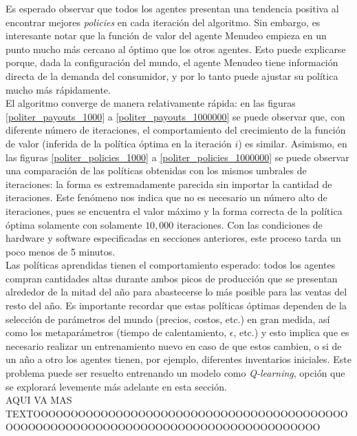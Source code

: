 Es esperado observar  que todos los agentes presentan una tendencia positiva al encontrar mejores \textit{policies} en cada iteraci\'on del algoritmo. Sin embargo, es interesante notar que la funci\'on de valor del agente Menudeo empieza en un punto mucho m\'as cercano al \'optimo que los otros agentes. Esto puede explicarse porque, dada la configuraci\'on del mundo, el agente Menudeo tiene informaci\'on directa de la demanda del consumidor, y por lo tanto puede ajustar su pol\'itica mucho m\'as r\'apidamente.\\

El algoritmo converge de manera relativamente r\'apida: en las figuras  \ref{politer_payouts_1000} a \ref{politer_payouts_1000000} se puede observar que, con diferente n\'umero de iteraciones, el comportamiento del crecimiento de la funci\'on de valor (inferida de la pol\'itica \'optima en la iteraci\'on $i$) es similar. Asimismo, en las figuras \ref{politer_policies_1000} a \ref{politer_policies_1000000} se puede observar una comparaci\'on de las pol\'iticas obtenidas con los mismos umbrales de iteraciones: la forma es extremadamente parecida sin importar la cantidad de iteraciones. Este fen\'omeno nos indica que no es necesario un n\'umero alto de iteraciones, pues se encuentra el valor m\'aximo y la forma correcta de la pol\'itica \'optima solamente con solamente $10,000$ iteraciones. Con las condiciones de hardware y software especificadas en secciones anteriores, este proceso tarda un poco menos de 5 minutos.\\

Las pol\'iticas aprendidas tienen el comportamiento esperado: todos los agentes compran cantidades altas durante ambos picos de producci\'on que se presentan alrededor de la mitad del a\~no para abastecerse lo m\'as posible para las ventas del resto del a\~no. Es importante recordar que estas pol\'iticas \'optimas dependen de la selecci\'on de par\'ametros del mundo (precios, costos, etc.) en gran medida, as\'i como los metapar\'ametros (tiempo de calentamiento, $\epsilon$, etc.) y esto implica que es necesario realizar un entrenamiento nuevo en caso de que estos cambien, o si de un a\~no a otro los agentes tienen, por ejemplo, diferentes inventarios iniciales. Este problema puede ser resuelto entrenando un modelo como \textit{Q-learning}, opci\'on que se explorar\'a levemente m\'as adelante en esta secci\'on.\\


AQUI VA MAS TEXTOOOOOOOOOOOOOOOOOOOOOOOOOOOOOOOOOOOOOOOOOOOOOOOOOOOOOOOOOOOOOOOOOOOOOOOOOOOOOOOOOOOO

